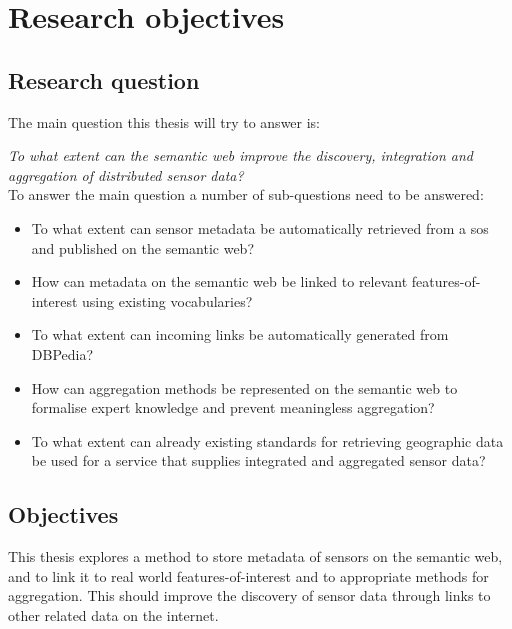 
\section{Research objectives}
\label{chap:objectives}


\subsection{Research question} 
The main question this thesis will try to answer is: 

\textit{To what extent can the semantic web improve the discovery, integration and aggregation of distributed sensor data?}\\

To answer the main question a number of sub-questions need to be answered:
\begin{itemize}
	\item To what extent can sensor metadata be automatically retrieved from a \ac{sos} and published on the semantic web?
	\item How can metadata on the semantic web be linked to relevant features-of-interest using existing vocabularies?
	\item To what extent can incoming links be automatically generated from DBPedia?
	\item How can aggregation methods be represented on the semantic web to formalise expert knowledge and prevent meaningless aggregation?
	\item To what extent can already existing standards for retrieving geographic data be used for a service that supplies integrated and aggregated sensor data?
\end{itemize}

\subsection{Objectives}

This thesis explores a method to store metadata of sensors on the semantic web, and to link it to real world features-of-interest and to appropriate methods for aggregation. This should improve the discovery of sensor data through links to other related data on the internet.  

